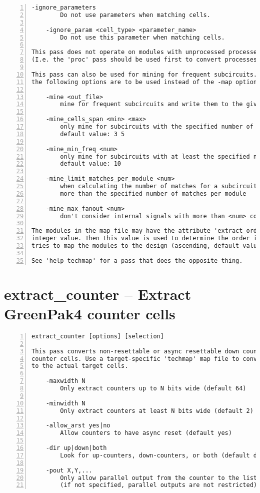 \begin{lstlisting}[numbers=left,frame=single]
    -ignore_parameters
        Do not use parameters when matching cells.

    -ignore_param <cell_type> <parameter_name>
        Do not use this parameter when matching cells.

This pass does not operate on modules with unprocessed processes in it.
(I.e. the 'proc' pass should be used first to convert processes to netlists.)

This pass can also be used for mining for frequent subcircuits. In this mode
the following options are to be used instead of the -map option.

    -mine <out_file>
        mine for frequent subcircuits and write them to the given ilang file

    -mine_cells_span <min> <max>
        only mine for subcircuits with the specified number of cells
        default value: 3 5

    -mine_min_freq <num>
        only mine for subcircuits with at least the specified number of matches
        default value: 10

    -mine_limit_matches_per_module <num>
        when calculating the number of matches for a subcircuit, don't count
        more than the specified number of matches per module

    -mine_max_fanout <num>
        don't consider internal signals with more than <num> connections

The modules in the map file may have the attribute 'extract_order' set to an
integer value. Then this value is used to determine the order in which the pass
tries to map the modules to the design (ascending, default value is 0).

See 'help techmap' for a pass that does the opposite thing.
\end{lstlisting}

\section{extract\_counter -- Extract GreenPak4 counter cells}
\label{cmd:extract_counter}
\begin{lstlisting}[numbers=left,frame=single]
    extract_counter [options] [selection]

This pass converts non-resettable or async resettable down counters to
counter cells. Use a target-specific 'techmap' map file to convert those cells
to the actual target cells.

    -maxwidth N
        Only extract counters up to N bits wide (default 64)

    -minwidth N
        Only extract counters at least N bits wide (default 2)

    -allow_arst yes|no
        Allow counters to have async reset (default yes)

    -dir up|down|both
        Look for up-counters, down-counters, or both (default down)

    -pout X,Y,...
        Only allow parallel output from the counter to the listed cell types
        (if not specified, parallel outputs are not restricted)
\end{lstlisting}


